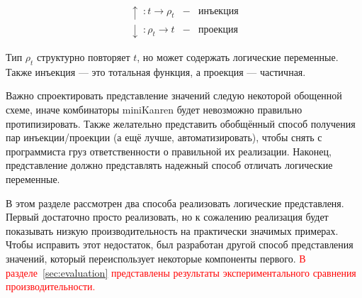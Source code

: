 \[
\begin{array}{rcl}
   \uparrow  \;: t \to \rho_t & - & \mbox{инъекция}\\
   \downarrow\;: \rho_t \to t & - & \mbox{проекция}
\end{array}
\]

\noindent Тип $\rho_t$ структурно повторяет $t$, но может содержать логические переменные. Также инъекция --- это тотальная функция, а проекция --- частичная.


Важно спроектировать представление значений следую некоторой обощенной схеме, иначе комбинаторы miniKanren будет невозможно правильно протипизировать.
Также желательно представить обобщённый способ получения пар инъекции/проекции (а ещё лучше, автоматизировать), чтобы снять с программиста груз ответственности о правильной их реализации. Наконец, представление должно представлять надежный способ отличать логические переменные.


В этом разделе рассмотрен два способа реализовать логические представленя.
Первый достаточно просто реализовать, но к сожалению реализация будет показывать низкую производительность на практически значимых примерах.
Чтобы исправить этот недостаток, был разработан другой способ представления значений, который переиспользует некоторые компоненты первого.
\textcolor{red}{В разделе~\ref{sec:evaluation} представлены результаты экспериментального сравнения производительности.}


